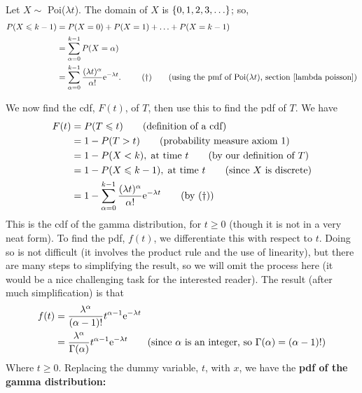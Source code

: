 \noindent Let $X \sim $ Poi($\lambda t$). The domain of $X$ is $\left\{0,1,2,3,\ldots\right\}$; so,
\begin{align*}
P(X \leq k - 1) & = P(X = 0) + P(X = 1) + \ldots + P(X = k-1) \\
	& = \sum_{\alpha=0}^{k-1}P(X = \alpha) \\
	& = \sum_{\alpha=0}^{k-1}\frac{(\lambda t)^\alpha}{\alpha!}\e^{-\lambda t}. \;\;\;\;\;\;\;\;\; (\dagger) \tag{using the pmf of Poi($\lambda t$), section \ref{lambda poisson}}
\end{align*}

\noindent We now find the cdf, $F(t)$, of $T$, then use this to find the pdf of $T$. We have
\begin{align*}
F(t)   & = P(T \leqslant t) \tag{definition of a cdf} \\
	& = 1 - P(T > t) \tag{probability measure axiom 1} \\
	& = 1 - P(X < k), \; \text{at time $t$} \tag{by our definition of $T$}  \\
	& = 1 - P(X \leqslant k-1), \; \text{at time $t$} \tag{since $X$ is discrete} \\
	& = 1 - \sum_{\alpha=0}^{k-1} \frac{(\lambda t)^\alpha}{\alpha!} \mathrm{e}^{-\lambda t } \tag{by ($\dagger$)}
\end{align*}
This is the cdf of the gamma distribution, for $t \geq 0$ (though it is not in a very neat form). To find the pdf, $f(t)$, we differentiate this with respect to $t$. Doing so is not difficult (it involves the product rule and the use of linearity), but there are many steps to simplifying the result, so we will omit the process here (it would be a nice challenging task for the interested reader). The result (after much simplification) is that
\begin{align*}
f(t)  & = \frac{\lambda^\alpha}{(\alpha-1)!}t^{\alpha-1}\mathrm{e}^{-\lambda t} \\
       & = \frac{\lambda^\alpha}{\Gamma(\alpha)}t^{\alpha-1}\mathrm{e}^{-\lambda t} \tag{since $\alpha$ is an integer, so $\Gamma(\alpha) = (\alpha-1)!$}
\end{align*}
Where $t \geq 0$. Replacing the dummy variable, $t$, with $x$, we have the \textbf{pdf of the gamma distribution:} \label{gamma(alpha,lambda)}

  	\bigskip
	
	\hfil{}
	\bigskip

